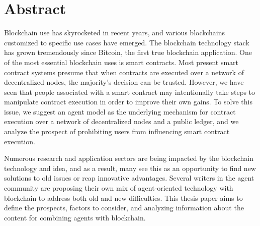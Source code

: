 \ifx\doclanguage\english
\chapter*{Abstract}

   Blockchain use has skyrocketed in recent years, and various blockchains customized to specific use cases have emerged. The blockchain technology stack has grown tremendously since Bitcoin, the first true blockchain application. One of the most essential blockchain uses is smart contracts. Most present smart contract systems presume that when contracts are executed over a network of decentralized nodes, the majority's decision can be trusted. However, we have seen that people associated with a smart contract may intentionally take steps to manipulate contract execution in order to improve their own gains. To solve this issue, we suggest an agent model as the underlying mechanism for contract execution over a network of decentralized nodes and a public ledger, and we analyze the prospect of prohibiting users from influencing smart contract execution.
    
    Numerous research and application sectors are being impacted by the blockchain technology and idea, and as a result, many see this as an opportunity to find new solutions to old issues or reap innovative advantages. Several writers in the agent community are proposing their own mix of agent-oriented technology with blockchain to address both old and new difficulties. This thesis paper aims to define the prospects, factors to consider, and analyzing information about the content for combining agents with blockchain.
    
    